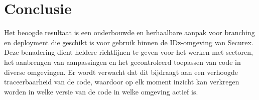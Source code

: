 
\chapter{Conclusie}%
\label{ch:conclusie}


Het beoogde resultaat is een onderbouwde en herhaalbare aanpak voor branching en deployment die geschikt is voor gebruik binnen de IDz-omgeving van Securex. Deze benadering dient heldere richtlijnen te geven voor het werken met sectoren, het aanbrengen van aanpassingen en het gecontroleerd toepassen van code in diverse omgevingen. Er wordt verwacht dat dit bijdraagt aan een verhoogde traceerbaarheid van de code, waardoor op elk moment inzicht kan verkregen worden in welke versie van de code in welke omgeving actief is.

